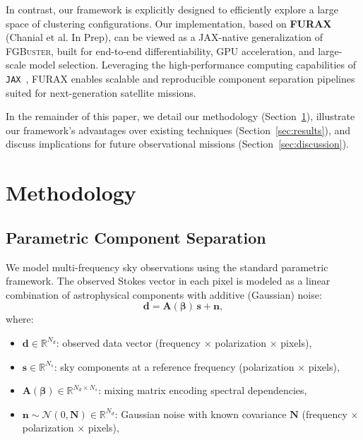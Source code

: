 \documentclass[%
 reprint,
bibnotes,
 amsmath,amssymb,
 aps,
floatfix, 
]{revtex4-2}
\begin{document}
In contrast, our framework is explicitly designed to efficiently explore a large space of clustering configurations. Our implementation, based on \textbf{FURAX}~\citep{FURAX} (Chanial et al. In Prep), can be viewed as a JAX-native generalization of \textsc{FGBuster}, built for end-to-end differentiability, GPU acceleration, and large-scale model selection. Leveraging the high-performance computing capabilities of \texttt{JAX}~\citep{JAX}, FURAX enables scalable and reproducible component separation pipelines suited for next-generation satellite missions.

In the remainder of this paper, we detail our methodology (Section~\ref{sec:methodology}), illustrate our framework’s advantages over existing techniques (Section~\ref{sec:results}), and discuss implications for future observational missions (Section~\ref{sec:discussion}).

\section{Methodology}
\label{sec:methodology}

\subsection{Parametric Component Separation}

We model multi-frequency sky observations using the standard parametric framework. The observed Stokes vector in each pixel is modeled as a linear combination of astrophysical components with additive (Gaussian) noise:
\begin{equation}
    \mathbf{d} = \mathbf{A}(\boldsymbol{\beta})\,\mathbf{s} + \mathbf{n},
    \label{eq:data_model}
\end{equation}
where:
\begin{itemize}
    \item \( \mathbf{d} \in \mathbb{R}^{N_d} \): observed data vector (frequency $\times$ polarization $\times$ pixels),
    \item \( \mathbf{s} \in \mathbb{R}^{N_s} \): sky components at a reference frequency (polarization $\times$ pixels),
    \item \( \mathbf{A}(\boldsymbol{\beta}) \in \mathbb{R}^{N_d \times N_s} \): mixing matrix encoding spectral dependencies,
    \item \( \mathbf{n} \sim \mathcal{N}(0, \mathbf{N}) \in \mathbb{R}^{N_d} \): Gaussian noise with known covariance \( \mathbf{N} \) (frequency $\times$ polarization $\times$ pixels),
\end{itemize}
\end{document}
